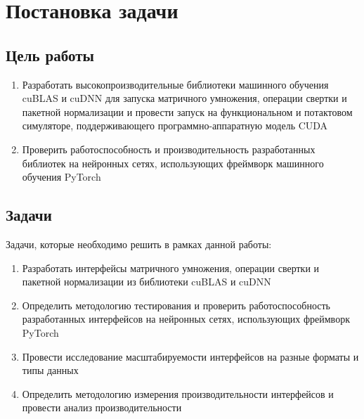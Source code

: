\section{Постановка задачи}
\subsection{Цель работы}
\begin{enumerate}
\item Разработать высокопроизводительные библиотеки машинного обучения cuBLAS и cuDNN для запуска матричного умножения,
операции свертки и пакетной нормализации и провести запуск на функциональном и потактовом симуляторе, поддерживающего
программно-аппаратную модель CUDA
\item Проверить работоспособность и производительность разработанных библиотек на нейронных сетях, использующих фреймворк
машинного обучения PyTorch
\end{enumerate}

\subsection{Задачи}
Задачи, которые необходимо решить в рамках данной работы:
\begin{enumerate}
\item Разработать интерфейсы матричного умножения, операции свертки и пакетной нормализации из библиотеки cuBLAS и cuDNN
\item Определить методологию тестирования и проверить работоспособность разработанных интерфейсов на нейронных сетях,
использующих фреймворк PyTorch
\item Провести исследование масштабируемости интерфейсов на разные форматы и типы данных
\item Определить методологию измерения производительности интерфейсов и провести анализ производительности
\end{enumerate}